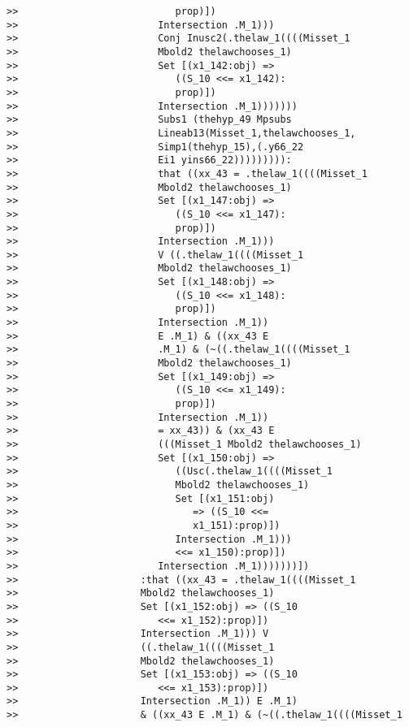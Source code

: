 \documentclass[12pt]{article}
\begin{document}
\begin{verbatim}
>>                           prop)])
>>                        Intersection .M_1)))
>>                        Conj Inusc2(.thelaw_1((((Misset_1
>>                        Mbold2 thelawchooses_1)
>>                        Set [(x1_142:obj) =>
>>                           ((S_10 <<= x1_142):
>>                           prop)])
>>                        Intersection .M_1)))))))
>>                        Subs1 (thehyp_49 Mpsubs
>>                        Lineab13(Misset_1,thelawchooses_1,
>>                        Simp1(thehyp_15),(.y66_22
>>                        Ei1 yins66_22))))))))):
>>                        that ((xx_43 = .thelaw_1((((Misset_1
>>                        Mbold2 thelawchooses_1)
>>                        Set [(x1_147:obj) =>
>>                           ((S_10 <<= x1_147):
>>                           prop)])
>>                        Intersection .M_1)))
>>                        V ((.thelaw_1((((Misset_1
>>                        Mbold2 thelawchooses_1)
>>                        Set [(x1_148:obj) =>
>>                           ((S_10 <<= x1_148):
>>                           prop)])
>>                        Intersection .M_1))
>>                        E .M_1) & ((xx_43 E
>>                        .M_1) & (~((.thelaw_1((((Misset_1
>>                        Mbold2 thelawchooses_1)
>>                        Set [(x1_149:obj) =>
>>                           ((S_10 <<= x1_149):
>>                           prop)])
>>                        Intersection .M_1))
>>                        = xx_43)) & (xx_43 E
>>                        (((Misset_1 Mbold2 thelawchooses_1)
>>                        Set [(x1_150:obj) =>
>>                           ((Usc(.thelaw_1((((Misset_1
>>                           Mbold2 thelawchooses_1)
>>                           Set [(x1_151:obj)
>>                              => ((S_10 <<=
>>                              x1_151):prop)])
>>                           Intersection .M_1)))
>>                           <<= x1_150):prop)])
>>                        Intersection .M_1)))))))])
>>                     :that ((xx_43 = .thelaw_1((((Misset_1
>>                     Mbold2 thelawchooses_1)
>>                     Set [(x1_152:obj) => ((S_10
>>                        <<= x1_152):prop)])
>>                     Intersection .M_1))) V
>>                     ((.thelaw_1((((Misset_1
>>                     Mbold2 thelawchooses_1)
>>                     Set [(x1_153:obj) => ((S_10
>>                        <<= x1_153):prop)])
>>                     Intersection .M_1)) E .M_1)
>>                     & ((xx_43 E .M_1) & (~((.thelaw_1((((Misset_1

\end{verbatim}
\end{document}
